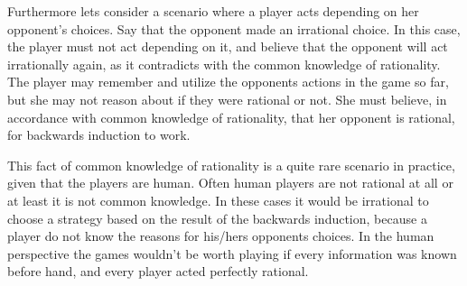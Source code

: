 Furthermore lets consider a scenario where a player acts depending on her opponent's choices. Say that the opponent made an irrational choice. In this case, the player must not act depending on it, and believe that the opponent will act irrationally again, as it contradicts with the common knowledge of rationality. The player may remember and utilize the opponents actions in the game so far, but she may not reason about if they were rational or not. She must believe, in accordance with common knowledge of rationality, that her opponent is rational, for backwards induction to work.

This fact of common knowledge of rationality is a quite rare scenario in practice, given that the players are human. Often human players are not rational at all or at least it is not common knowledge. In these cases it would be irrational to choose a strategy based on the result of the backwards induction, because a player do not know the reasons for his/hers opponents choices.
In the human perspective the games wouldn't be worth playing if every information was known before hand, and every player acted perfectly rational.